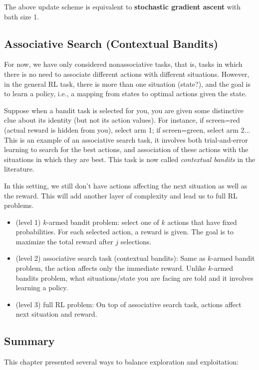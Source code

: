 \documentclass[lang=en,mode=geye,device=normal,color=blue,14pt]{elegantnote}
\DeclareMathOperator*{\1}{\mathbbm{1}}
\begin{document}
The above update scheme is equivalent to \textbf{stochastic gradient ascent} with bath size 1.

\subsection{Associative Search (Contextual Bandits)}

For now, we have only considered nonassociative tasks, that is, tasks in which there is no need to associate different actions with different situations.
However, in the general RL task, there is more than one situation (state?), and the goal is to learn a policy, i.e., a mapping from states to optimal actions given the state.

Suppose when a bandit task is selected for you, you are given some distinctive clue about its identity (but not its action values). For instance, if screen=red (actual reward is hidden from you), select arm 1; if screen=green, select arm 2... This is an example of an associative search task, it involves both trial-and-error learning to search for the best actions, and association of these actions with the situations in which they are best. This task is now called \textit{contextual bandits} in the literature.

In this setting, we still don't have actions affecting the next situation as well as the reward. This will add another layer of complexity and lead us to full RL problems.

\begin{itemize}
\item (level 1) $k$-armed bandit problem: select one of $k$ actions that have fixed probabilities. For each selected action, a reward is given. The goal is to maximize the total reward after $j$ selections.
\item (level 2) associative search task (contextual bandits): Same as $k$-armed bandit problem, the action affects only the immediate reward. Unlike $k$-armed bandits problem, what situations/state you are facing are told and it involves learning a policy.
\item (level 3) full RL problem: On top of associative search task, actions affect next situation and reward.
\end{itemize}

\subsection{Summary}

This chapter presented several ways to balance exploration and exploitation:
\end{document}
